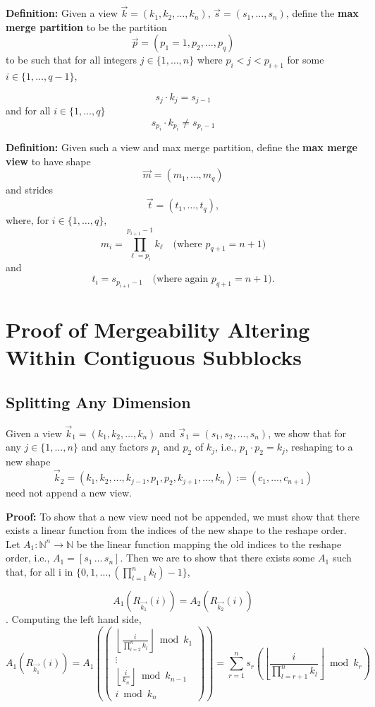 \documentclass{article}
\begin{document}
\textbf{Definition:} Given a view $\vec{k} = (k_1, k_2, \ldots, k_n)$, $\vec{s} = (s_1, \ldots, s_n)$, define the \textbf{max merge partition} to be the partition 
\[
\vec{p} = (p_1 = 1, p_2, \ldots, p_{q})
\]
to be such that for all integers $j \in \{ 1, \ldots, n \}$ where $p_i < j < p_{i+1}$ for some $i \in \{ 1, \ldots, q - 1 \}$,

\[
s_j \cdot k_j = s_{j-1}
\]
and for all $i \in \{ 1, \ldots, q \}$
\[
\quad s_{p_i} \cdot k_{p_i} \neq s_{p_i - 1} \quad
\]

\textbf{Definition:} Given such a view and max merge partition, define the \textbf{max merge view} to have shape 
\[
\vec{m} = (m_1, \ldots, m_{q})
\]
and strides 
\[
\vec{t} = (t_1, \ldots, t_{q}),
\]
where, for $i \in \{ 1, \ldots, q \}$,
\[
m_i = \prod_{\ell = p_i}^{p_{i+1}-1} k_{\ell} \quad \text{(where $p_{q + 1} = n + 1$)}
\]
and
\[
t_i = s_{p_{i+1} - 1} \quad \text{(where again $p_{q + 1} = n + 1$)}.
\]




\section{Proof of Mergeability Altering Within Contiguous Subblocks}

\subsection{Splitting Any Dimension}

Given a view $\vec{k}_1 = (k_1, k_2, \ldots, k_n)$ and $\vec{s}_1 = (s_1, s_2, \ldots, s_n)$, we show that for any $j \in \{1, \ldots, n\}$ and any factors $p_1$ and $p_2$ of $k_j$, i.e., $p_1 \cdot p_2 = k_j$, reshaping to a new shape 
\[
\vec{k}_2 = (k_1, k_2, \ldots, k_{j-1}, p_1, p_2, k_{j+1}, \ldots, k_n) := (c_1, \ldots, c_{n+1})
\]
need not append a new view.

\textbf{Proof:}
To show that a new view need not be appended, we must show that there exists a linear function from the indices of the new shape to the reshape order. Let $A_1 : \mathbb{N}^n \rightarrow \mathbb{N}$ be the linear function mapping the old indices to the reshape order, i.e., $A_1 = [s_1 \, \ldots \, s_n]$. Then we are to show that there exists some $A_1$ such that, for all i in $\{0, 1, \ldots, (\prod_{l=1}^n k_l) - 1\}$,

\[A_1(R_{\vec{k_1}}(i)) = A_2(R_{\vec{k_2}}(i))
\].
Computing the left hand side,
\[A_1(R_{\vec{k_1}}(i))=A_1(\begin{pmatrix}
\left\lfloor \frac{i}{\prod_{l=2}^{n} k_l} \right\rfloor \bmod k_1 \\
\vdots \\
\left\lfloor \frac{i}{k_n} \right\rfloor \bmod k_{n-1} \\
i \bmod k_n
\end{pmatrix})=\sum_{r=1}^{n} s_r \left( \left\lfloor \frac{i}{\prod_{l=r+1}^{n} k_l} \right\rfloor \bmod k_r \right)
\]
\end{document}
